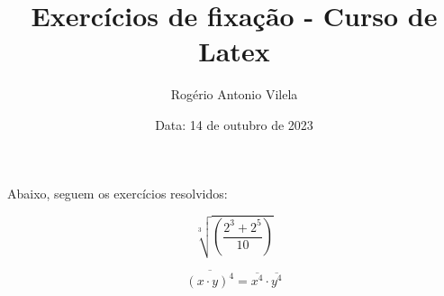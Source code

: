 \documentclass[a4paper, 12pt]{article}
\title{\textbf{Exercícios de fixação - Curso de Latex}}
\author{Rogério Antonio Vilela}
\date{Data: 14 de outubro de 2023}
\begin{document}
\maketitle

Abaixo, seguem os exercícios resolvidos:

\begin{equation}
\sqrt[3]{\left( \frac{2^{3} + 2^{5}}{10}\right)}
\end{equation}

\begin{equation}
\overline{(x \cdot y)^4} = \overline{x^{4}} \cdot \overline{y^{4}}
\end{equation}
\end{document}
